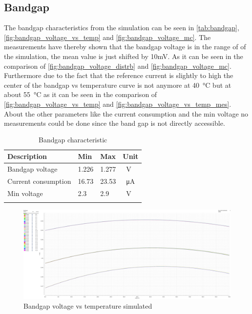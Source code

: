 \subsection{Bandgap}
The bandgap characteristics from the simulation can be seen in \autoref{tab:bandgap}, \autoref{fig:bandgap_voltage_vs_temp} and \autoref{fig:bandgap_voltage_mc}. The measurements have thereby shown that the bandgap voltage is in the range of of the simulation, the mean value is just shifted by 10mV. As it can be seen in the comparison of \autoref{fig:bandgap_voltage_distrb} and \autoref{fig:bandgap_voltage_mc}. Furthermore due to the fact that the reference current is slightly to high the center of the bandgap vs temperature curve is not anymore at \qty{40}{\degreeCelsius} but at about \qty{55}{\degreeCelsius} as it can be seen in the comparison of \autoref{fig:bandgap_voltage_vs_temp} and \autoref{fig:bandgap_voltage_vs_temp_mes}. About the other parameters like the current consumption and the min voltage no measurements could be done since the band gap is not directly accessible.
\begin{longtable}{|p{3.5cm}|p{3.5cm}|p{3.5cm}|p{3.5cm}|}
	\hline
	\rowcolor{lightgray}
	\textbf{Description} &\textbf{Min} &\textbf{Max} & \textbf{Unit} \\ \hline
	
	Bandgap voltage & 1.226 & 1.277 &\qty{}{\volt} \\ \hline
	Current consumption & 16.73 & 23.53 & \qty{}{\micro\ampere} \\ \hline
	Min voltage & 2.3& 2.9 & \qty{}{\volt} \\ \hline
	\caption{Bandgap characteristic} %
	\label{tab:bandgap}
\end{longtable}
\begin{figure}[ht]
	\centering
	\includegraphics[width=\textwidth]{images/05_bandgap/band_volt.pdf}
	\caption{Bandgap voltage vs temperature simulated}
	\label{fig:bandgap_voltage_vs_temp}
\end{figure}
